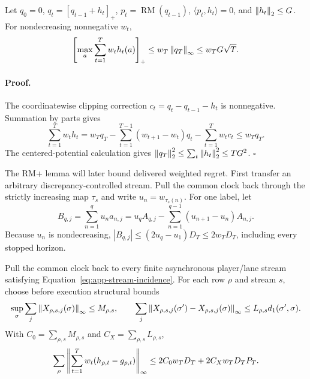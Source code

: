 \begin{lemma}
\label{lem:app-weighted-rmplus-envelope}
Let $q_0=0$, $q_t=[q_{t-1}+h_t]_+$,
$p_t=\operatorname{RM}(q_{t-1})$, $\langle p_t,h_t\rangle=0$, and
$\left\lVert h_t \right\rVert_2\le G$.  For nondecreasing nonnegative $w_t$,
\begin{equation}
 \left[\max_a\sum_{t=1}^T w_th_t(a)\right]_+
 \le w_T\left\lVert q_T \right\rVert_\infty\le w_TG\sqrt T .
\label{eq:app-weighted-rmplus-envelope}
\end{equation}
\end{lemma}

\paragraph{Proof.}
The coordinatewise clipping correction
$c_t=q_t-q_{t-1}-h_t$ is nonnegative.  Summation by parts gives
\begin{equation}
 \sum_{t=1}^T w_th_t
 =w_Tq_T-\sum_{t=1}^{T-1}(w_{t+1}-w_t)q_t
       -\sum_{t=1}^T w_tc_t
 \le w_Tq_T .
\label{eq:app-weighted-rmplus-telescope}
\end{equation}
The centered-potential calculation gives
$\left\lVert q_T \right\rVert_2^2\le\sum_t\left\lVert h_t \right\rVert_2^2\le TG^2$. \hfill$\square$

The RM+ lemma will later bound delivered weighted regret.  First transfer an
arbitrary discrepancy-controlled stream.  Pull the common clock back through
the strictly increasing map $\tau_s$ and write $u_n=w_{\tau_s(n)}$.  For one
label, let
\begin{equation}
B_{q,j}=\sum_{n=1}^q u_na_{n,j}
=u_qA_{q,j}-\sum_{n=1}^{q-1}(u_{n+1}-u_n)A_{n,j}.
\label{eq:app-weighted-prefix-discrepancy}
\end{equation}
Because $u_n$ is nondecreasing,
$|B_{q,j}|\le(2u_q-u_1)D_T\le2w_TD_T$, including every stopped horizon.

\begin{lemma}
\label{lem:app-global-weighted-transfer}
Pull the common clock back to every finite asynchronous player/lane stream
satisfying Equation~\ref{eq:app-stream-incidence}.
For each row $\rho$ and stream $s$, choose before execution structural bounds
\[
\sup_\sigma\sum_j\left\lVert X_{\rho,s,j}(\sigma) \right\rVert_\infty\le M_{\rho,s},\qquad
\sum_j\left\lVert X_{\rho,s,j}(\sigma')-X_{\rho,s,j}(\sigma) \right\rVert_\infty
\le L_{\rho,s}d_1(\sigma',\sigma).
\]
With $C_0=\sum_{\rho,s}M_{\rho,s}$ and
$C_X=\sum_{\rho,s}L_{\rho,s}$,
\begin{equation}
\sum_\rho\left\lVert \sum_{t=1}^T w_t
 (h_{\rho,t}-g_{\rho,t}) \right\rVert_\infty
\le2C_0w_TD_T+2C_Xw_TD_TP_T.
\label{eq:app-global-weighted-transfer}
\end{equation}
\end{lemma}


